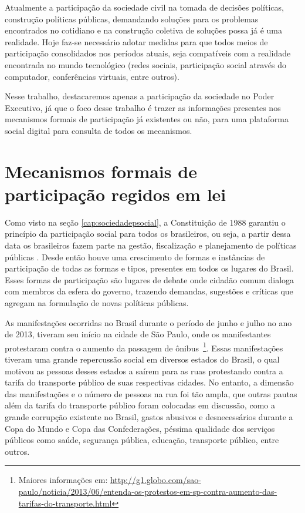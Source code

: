 Atualmente a participação da sociedade civil na tomada de decisões políticas, construção políticas públicas, demandando soluções para os problemas encontrados no cotidiano e na construção coletiva de soluções possa já é uma realidade. Hoje faz-se necessário adotar medidas para que todos meios de participação consolidados nos períodos atuais, seja compatíveis com a realidade encontrada no mundo tecnológico (redes sociais, participação social através do computador, conferências virtuais, entre outros).

Nesse trabalho, destacaremos apenas a participação da sociedade no Poder Executivo, já que o foco desse trabalho é trazer as informações presentes nos mecanismos formais de participação já existentes ou não, para uma plataforma social digital para consulta de todos os mecanismos.

\section{Mecanismos formais de participação regidos em lei}
\label{sec:mecformalpart}

Como visto na seção \ref{cap:sociedadepsocial}, a Constituição de 1988 garantiu o  princípio da participação social para todos os brasileiros, ou seja, a partir dessa data os brasileiros fazem parte na gestão, fiscalização e planejamento de políticas públicas \cite{trajano2011controle}. Desde então houve uma crescimento de formas e instâncias de participação de todas as formas e tipos, presentes em todos os lugares do Brasil. Esses formas de participação são lugares de debate onde cidadão comum dialoga com membros da esfera do governo, trazendo demandas, sugestões e críticas que agregam na formulação de novas políticas públicas. 

As manifestações ocorridas no Brasil durante o período de junho e julho no ano de 2013, tiveram seu início na cidade de São Paulo, onde os manifestantes protestaram contra o aumento da passagem de ônibus~\footnote{Maiores informações em: \url{http://g1.globo.com/sao-paulo/noticia/2013/06/entenda-os-protestos-em-sp-contra-aumento-das-tarifas-do-transporte.html}}. Essas manifestações tiveram uma grande repercussão social em diversos estados do Brasil, o qual motivou as pessoas desses estados a saírem para as ruas protestando contra a tarifa do transporte público de suas respectivas cidades. No entanto, a dimensão das manifestações e o número de pessoas na rua foi tão ampla, que outras pautas além da tarifa do transporte público foram colocadas em discussão, como a grande corrupção existente no Brasil, gastos abusivos e desnecessários durante a Copa do Mundo e Copa das Confederações, péssima qualidade dos serviços públicos como saúde, segurança pública, educação, transporte público, entre outros.

